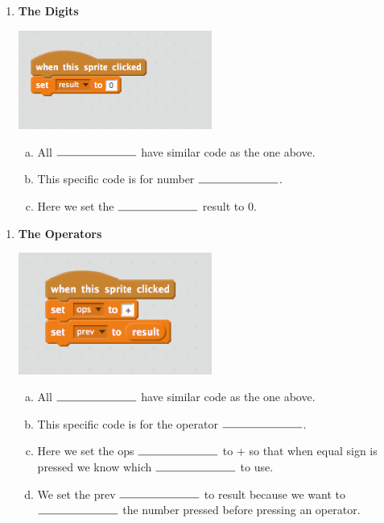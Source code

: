 \documentclass[11pt]{article}
\begin{document}
\noindent\makebox[\linewidth]{\rule{\paperwidth}{0.4pt}}
\begin{enumerate}
\item \textbf{The Digits}
\begin{center}
  \includegraphics[width=2.5in]{numbers.png}
 \end{center}
\begin{enumerate}[a.]
\item All $\rule{2.5cm}{0.15mm}$ have similar code as the one above.
\item This specific code is for number $\rule{2.5cm}{0.15mm}$.
\item Here we set the $\rule{2.5cm}{0.15mm}$ result to 0.
\end{enumerate}
\end{enumerate}
\noindent\makebox[\linewidth]{\rule{\paperwidth}{0.4pt}}
\begin{enumerate}
\item \textbf{The Operators}
\begin{center}
  \includegraphics[width=2.5in]{ops.png}
 \end{center}
\begin{enumerate}[a.]
\item All $\rule{2.5cm}{0.15mm}$ have similar code as the one above.
\item This specific code is for the operator $\rule{2.5cm}{0.15mm}$.
\item Here we set the ops $\rule{2.5cm}{0.15mm}$ to + so that when equal sign is pressed we know which $\rule{2.5cm}{0.15mm}$ to use.
\item We set the prev $\rule{2.5cm}{0.15mm}$ to result because we want to $\rule{2.5cm}{0.15mm}$ the number pressed before pressing an operator.
\end{enumerate}
\end{enumerate}
\end{document}
